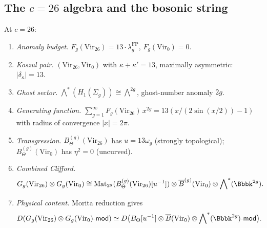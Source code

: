 %
%

\subsection{The $c = 26$ algebra and the bosonic string}
\label{subsec:bosonic-string}

\begin{proposition}
\label{prop:bosonic-string-identifications}
At $c = 26$:
\begin{enumerate}[label=\textup{(\roman*)}]
\item \emph{Anomaly budget.}\;
$F_g(\mathrm{Vir}_{26}) = 13 \cdot \lambda_g^{\mathrm{FP}}$,
$F_g(\mathrm{Vir}_0) = 0$.

\item \emph{Koszul pair.}\;
$(\mathrm{Vir}_{26}, \mathrm{Vir}_0)$ with $\kappa + \kappa' = 13$,
maximally asymmetric: $|\delta_\kappa| = 13$.

\item \emph{Ghost sector.}\;
$\bigwedge^*(H_1(\Sigma_g)) \cong \bigwedge^{2g}$, ghost-number
anomaly $2g$.

\item \emph{Generating function.}\;
$\sum_{g=1}^\infty F_g(\mathrm{Vir}_{26})\,x^{2g}
= 13(x/(2\sin(x/2)) - 1)$
with radius of convergence $|x| = 2\pi$.

\item \emph{Transgression.}\;
$B_\Theta^{(g)}(\mathrm{Vir}_{26})$ has $u = 13\omega_g$
(strongly topological); $B_\Theta^{(g)}(\mathrm{Vir}_0)$ has
$\eta^2 = 0$ (uncurved).

\item \emph{Combined Clifford.}\;
\begin{equation}\label{eq:g9-combined-final}
G_g(\mathrm{Vir}_{26}) \otimes G_g(\mathrm{Vir}_0)
\cong
\mathrm{Mat}_{2^g}(B_\Theta^{(g)}(\mathrm{Vir}_{26})[u^{-1}])
\otimes \barB^{(g)}(\mathrm{Vir}_0)
\otimes \bigwedge\nolimits^*(\Bbbk^{2g}).
\end{equation}

\item \emph{Physical content.}\; Morita reduction gives
\begin{equation}\label{eq:g9-physical-content}
D(G_g(\mathrm{Vir}_{26}) \otimes G_g(\mathrm{Vir}_0)
\text{-}\mathsf{mod})
\simeq
D\bigl(B_\Theta[u^{-1}] \otimes \barB(\mathrm{Vir}_0) \otimes
\bigwedge\nolimits^*(\Bbbk^{2g})\text{-}\mathsf{mod}\bigr).
\end{equation}
\end{enumerate}
\end{proposition}

